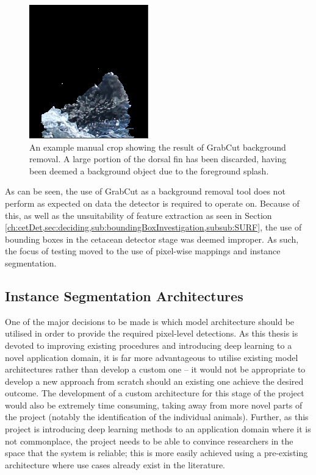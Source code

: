 \begin{figure}
	\begin{center}
		\includegraphics[scale=0.6]{Chapter3/figs/grabcut-example.png}
	\end{center}
	\caption[An example manual crop showing the result of GrabCut background removal.]{An example manual crop showing the result of GrabCut background removal. A large portion of the dorsal fin has been discarded, having been deemed a background object due to the foreground splash.
	}
	\label{fig:grabcut-example}
\end{figure}

As can be seen, the use of GrabCut as a background removal tool does not perform as expected on data the detector is required to operate on. Because of this, as well as the unsuitability of feature extraction as seen in Section \ref{ch:cetDet,sec:deciding,sub:boundingBoxInvestigation,subsub:SURF}, the use of bounding boxes in the cetacean detector stage was deemed improper. As such, the focus of testing moved to the use of pixel-wise mappings and instance segmentation.  

\subsection{Instance Segmentation Architectures}\label{ch:cetDet,sec:deciding,sub:instanceSegArchitectures}

One of the major decisions to be made is which model architecture should be utilised in order to provide the required pixel-level detections. As this thesis is devoted to improving existing procedures and introducing deep learning to a novel application domain, it is far more advantageous to utilise existing model architectures rather than develop a custom one -- it would not be appropriate to develop a new approach from scratch should an existing one achieve the desired outcome. The development of a custom architecture for this stage of the project would also be extremely time consuming, taking away from more novel parts of the project (notably the identification of the individual animals). Further, as this project is introducing deep learning methods to an application domain where it is not commonplace, the project needs to be able to convince researchers in the space that the system is reliable; this is more easily achieved using a pre-existing architecture where use cases already exist in the literature. 

